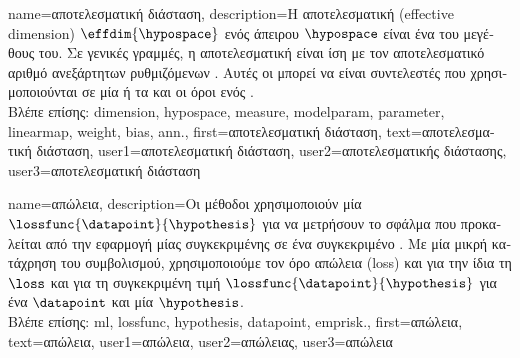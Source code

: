 {name={\foreignlanguage{greek}{αποτελεσματική διάσταση}},
	description={\foreignlanguage{greek}{Η αποτελεσματική}  
		(effective dimension) $\effdim{\hypospace}$ \foreignlanguage{greek}{ενός ά\-πειρου}  $\hypospace$ 
		\foreignlanguage{greek}{είναι ένα}  \foreignlanguage{greek}{του μεγέθους του. 
		Σε γενικές γραμμές, η αποτελεσματική}  \foreignlanguage{greek}{είναι ίση με τον αποτελεσματικό αριθμό 
		ανεξάρτητων ρυθμιζόμενων} . \foreignlanguage{greek}{Αυτές οι}
		 \foreignlanguage{greek}{μπορεί να είναι συντελεστές που χρησιμοποιούνται σε μία}  
		\foreignlanguage{greek}{ή τα}  \foreignlanguage{greek}{και οι όροι}  \foreignlanguage{greek}{ενός} 
		.
		\\
		\foreignlanguage{greek}{Βλέπε επίσης:} \gls{dimension}, \gls{hypospace}, \gls{measure}, \gls{modelparam}, \gls{parameter}, \gls{linearmap}, 
		\gls{weight}, \gls{bias}, \gls{ann}.},
	first={\foreignlanguage{greek}{αποτελεσματική διάσταση}},
	text={\foreignlanguage{greek}{αποτελεσματική διάσταση}},
	user1={\foreignlanguage{greek}{αποτελεσματική διάσταση}}, %
	user2={\foreignlanguage{greek}{αποτελεσματικής διάστασης}}, %
	user3={\foreignlanguage{greek}{αποτελεσματική διάσταση}} %
}

{name={\foreignlanguage{greek}{απώλεια}}, 
	description={\foreignlanguage{greek}{Οι μέθοδοι}  
		\foreignlanguage{greek}{χρησιμοποιούν μία}  $\lossfunc{\datapoint}{\hypothesis}$ \foreignlanguage{greek}{για 
		να μετρήσουν το σφάλμα που προκαλείται από την εφαρμογή μίας συγκεκριμένης}  
		\foreignlanguage{greek}{σε ένα συγκεκριμένο} . \foreignlanguage{greek}{Με μία μικρή κατάχρηση του 
		συμβολισμού, χρησιμοποιούμε τον όρο απώλεια} (loss) \foreignlanguage{greek}{και για την ίδια τη}  $\loss$ 
		\foreignlanguage{greek}{και για τη συγκεκριμένη τιμή} $\lossfunc{\datapoint}{\hypothesis}$ \foreignlanguage{greek}{για ένα} 
		 $\datapoint$ \foreignlanguage{greek}{και μία}  $\hypothesis$.
		\\
		\foreignlanguage{greek}{Βλέπε επίσης:} \gls{ml}, \gls{lossfunc}, \gls{hypothesis}, \gls{datapoint}, \gls{emprisk}.},
	first={\foreignlanguage{greek}{απώλεια}},
	text={\foreignlanguage{greek}{απώλεια}},
	user1={\foreignlanguage{greek}{απώλεια}}, %
	user2={\foreignlanguage{greek}{απώλειας}}, %
	user3={\foreignlanguage{greek}{απώλεια}} %
}

